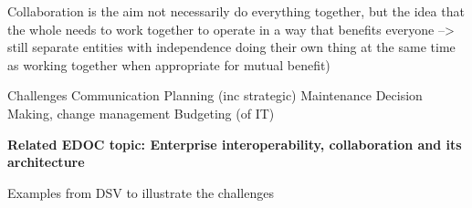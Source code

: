     Collaboration is the aim
        not necessarily do everything together, but the idea that the whole needs to work together to operate in a way that benefits everyone --> still separate entities with independence doing their own thing at the same time as working together when appropriate for mutual benefit)
        
    Challenges
        Communication
        Planning (inc strategic)
        Maintenance
        Decision Making, change management
        Budgeting (of IT)
        
    \textbf{Related EDOC topic: Enterprise interoperability, collaboration and its architecture}
    
    Examples from DSV to illustrate the challenges
